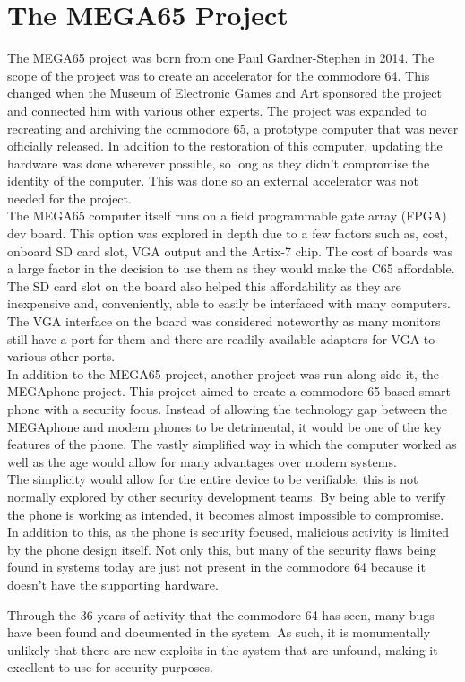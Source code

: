 
\section{The MEGA65 Project}

\label{Ch2 Sec4}

The MEGA65 project was born from one Paul Gardner-Stephen in 2014.
The scope of the project was to create an accelerator for the commodore 64.
This changed when the Museum of Electronic Games and Art sponsored the project and connected him with various other experts.\cite{Reference27}
The project was expanded to recreating and archiving the commodore 65, a prototype computer that was never officially released.
In addition to the restoration of this computer, updating the hardware was done wherever possible, so long as they didn’t compromise the identity of the computer.\cite{Reference27}
This was done so an external accelerator was not needed for the project.\\

The MEGA65 computer itself runs on a field programmable gate array (FPGA) dev board.
This option was explored in depth due to a few factors such as, cost, onboard SD card slot, VGA output and the Artix-7 chip.
The cost of boards was a large factor in the decision to use them as they would make the C65 affordable.
The SD card slot on the board also helped this affordability as they are inexpensive and, conveniently, able to easily be interfaced with many computers.
The VGA interface on the board was considered noteworthy as many monitors still have a port for them and there are readily available adaptors for VGA to various other ports.\cite{Reference27}\\

In addition to the MEGA65 project, another project was run along side it, the MEGAphone project.
This project aimed to create a commodore 65 based smart phone with a security focus.
Instead of allowing the technology gap between the MEGAphone and modern phones to be detrimental, it would be one of the key features of the phone.
The vastly simplified way in which the computer worked as well as the age would allow for many advantages over modern systems.\\

The simplicity would allow for the entire device to be verifiable, this is not normally explored by other security development teams.
By being able to verify the phone is working as intended, it becomes almost impossible to compromise.
In addition to this, as the phone is security focused, malicious activity is limited by the phone design itself.
Not only this, but many of the security flaws being found in systems today are just not present in the commodore 64 because it doesn’t have the supporting hardware.

Through the 36 years of activity that the commodore 64 has seen, many bugs have been found and documented in the system.
As such, it is monumentally unlikely that there are new exploits in the system that are unfound, making it excellent to use for security purposes.

